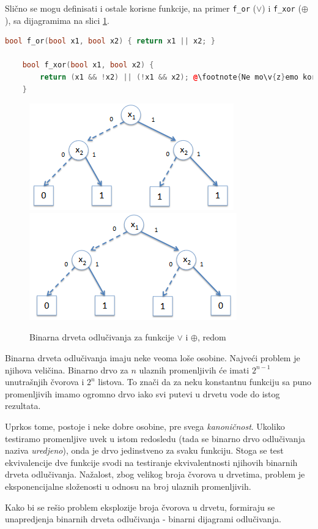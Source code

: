 \noindent Sli\v{c}no se mogu definisati i ostale korisne funkcije, na primer \texttt{f\_or} ($\vee$) i \texttt{f\_xor} ($\oplus$), sa dijagramima na slici \ref{fig:BDOrXor}.

\begin{lstlisting}[language=C++,escapechar=@]
    bool f_or(bool x1, bool x2) { return x1 || x2; }

    bool f_xor(bool x1, bool x2) {
        return (x1 && !x2) || (!x1 && x2); @\footnote{Ne mo\v{z}emo koristiti operator \^{} jer on operi\v{s}e nad promenljivima tipa \emph{int}, a ne \emph{bool}.}@
    }
\end{lstlisting}

\begin{figure}[H]
    \includegraphics[scale=0.68]{slike/BD_Or.PNG}
    \includegraphics[scale=0.68]{slike/BD_Xor.PNG}
    \caption{Binarna drveta odlu\v{c}ivanja za funkcije $\vee$ i $\oplus$, redom}
    \label{fig:BDOrXor}
\end{figure}

Binarna drveta odlu\v{c}ivanja imaju neke veoma lo\v{s}e osobine. Najve\'c{}i problem je njihova veli\v{c}ina. Binarno drvo za $n$ ulaznih promenljivih \'c{}e imati $2^{n-1}$ unutra\v{s}njih \v{c}vorova i $2^{n}$ listova. To zna\v{c}i da za neku konstantnu funkciju sa puno promenljivih imamo ogromno drvo iako svi putevi u drvetu vode do istog rezultata.

Uprkos tome, postoje i neke dobre osobine, pre svega \emph{kanoni\v{c}nost}. Ukoliko testiramo promenljive uvek u istom redosledu (tada se binarno drvo odlu\v{c}ivanja naziva \emph{uredjeno}), onda je drvo jedinstveno za svaku funkciju. Stoga se test ekvivalencije dve funkcije svodi na testiranje ekvivalentnosti njihovih binarnih drveta odlu\v{c}ivanja. Na\v{z}alost, zbog velikog broja \v{c}vorova u drvetima, problem je eksponencijalne slo\v{z}enosti u odnosu na broj ulaznih promenljivih.

Kako bi se re\v{s}io problem eksplozije broja \v{c}vorova u drvetu, formiraju se unapredjenja binarnih drveta odlu\v{c}ivanja - binarni dijagrami odlu\v{c}ivanja.
